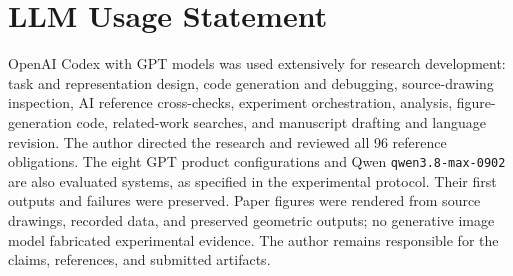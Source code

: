 \section*{LLM Usage Statement}
OpenAI Codex with GPT models was used extensively for research
development: task and representation design, code generation and
debugging, source-drawing inspection, AI reference cross-checks,
experiment orchestration, analysis, figure-generation code,
related-work searches, and manuscript drafting and language revision.
The author directed the research and reviewed all 96 reference
obligations. The eight GPT product configurations and Qwen
\texttt{qwen3.8-max-0902} are also evaluated systems, as specified
in the experimental protocol. Their first outputs and failures were
preserved. Paper figures were rendered from source drawings,
recorded data, and preserved geometric outputs; no generative image
model fabricated experimental evidence. The author remains
responsible for the claims, references, and submitted artifacts.
